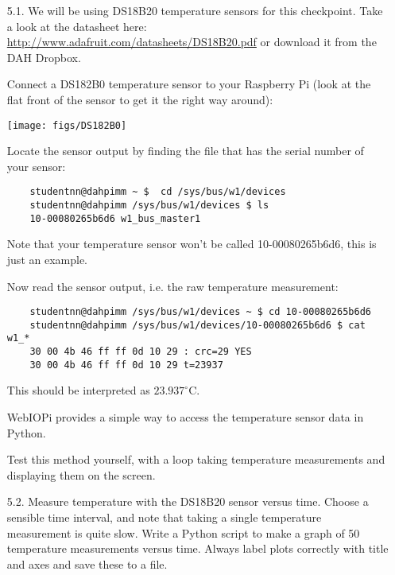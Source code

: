 \begin{enumerate}

\item [5.1.] We will be using DS18B20 temperature sensors for this checkpoint.
Take a look at the datasheet here: \url{http://www.adafruit.com/datasheets/DS18B20.pdf} or download it from the DAH Dropbox.

Connect a DS182B0 temperature sensor to your Raspberry Pi (look at the flat front of the sensor to get it the right way around):
\begin{center}
    \texttt{[image: figs/DS182B0]}
\end{center}


%

Locate the sensor output by finding the file that has the serial number of your sensor:
\begin{verbatim} 
    studentnn@dahpimm ~ $  cd /sys/bus/w1/devices 
    studentnn@dahpimm /sys/bus/w1/devices $ ls 
    10-00080265b6d6 w1_bus_master1 
\end{verbatim}
Note that your temperature sensor won't be called 10-00080265b6d6, this is just an example.

Now read the sensor output, i.e. the raw temperature measurement:
\begin{verbatim}
    studentnn@dahpimm /sys/bus/w1/devices ~ $ cd 10-00080265b6d6
    studentnn@dahpimm /sys/bus/w1/devices/10-00080265b6d6 $ cat w1_*
    30 00 4b 46 ff ff 0d 10 29 : crc=29 YES 
    30 00 4b 46 ff ff 0d 10 29 t=23937 
\end{verbatim}
This should be interpreted as $23.937^{\circ}$C.

\newpage
WebIOPi provides a simple way to access the temperature sensor data in Python.


Test this method yourself, with a loop taking temperature measurements and displaying them on the screen.



\item[5.2.] Measure temperature with the DS18B20 sensor versus time.
Choose a sensible time interval, and note that taking a single temperature measurement is quite slow.
Write a Python script to make a graph of 50 temperature measurements versus time.
Always label plots correctly with title and axes and save these to a file.
 

\end{enumerate}
